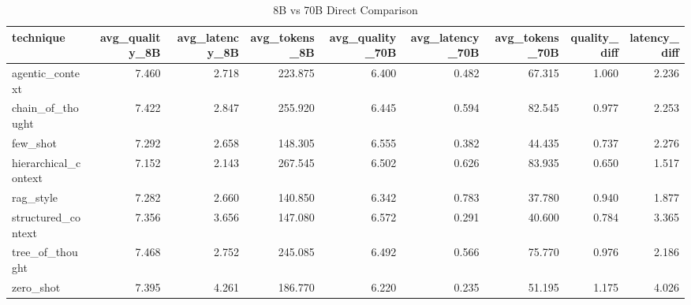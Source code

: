 \begin{table}
\caption{8B vs 70B Direct Comparison}
\begin{tabular}{lrrrrrrrr}
\toprule
technique & avg_quality_8B & avg_latency_8B & avg_tokens_8B & avg_quality_70B & avg_latency_70B & avg_tokens_70B & quality_diff & latency_diff \\
\midrule
agentic_context & 7.460 & 2.718 & 223.875 & 6.400 & 0.482 & 67.315 & 1.060 & 2.236 \\
chain_of_thought & 7.422 & 2.847 & 255.920 & 6.445 & 0.594 & 82.545 & 0.977 & 2.253 \\
few_shot & 7.292 & 2.658 & 148.305 & 6.555 & 0.382 & 44.435 & 0.737 & 2.276 \\
hierarchical_context & 7.152 & 2.143 & 267.545 & 6.502 & 0.626 & 83.935 & 0.650 & 1.517 \\
rag_style & 7.282 & 2.660 & 140.850 & 6.342 & 0.783 & 37.780 & 0.940 & 1.877 \\
structured_context & 7.356 & 3.656 & 147.080 & 6.572 & 0.291 & 40.600 & 0.784 & 3.365 \\
tree_of_thought & 7.468 & 2.752 & 245.085 & 6.492 & 0.566 & 75.770 & 0.976 & 2.186 \\
zero_shot & 7.395 & 4.261 & 186.770 & 6.220 & 0.235 & 51.195 & 1.175 & 4.026 \\
\bottomrule
\end{tabular}
\end{table}
